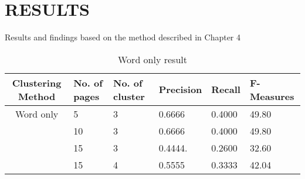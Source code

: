 \chapter{RESULTS}
Results and findings based on the method described in Chapter 4
\begin{table}[ht!]
\caption {Word only result}
\label{tab:Word only result}
\begin{center}
\begin{tabular}{|c|p{2cm}|p{1.5cm}|p{1.5cm}|p{2.1cm}|p{1.5cm}|} \hline

Clustering Method & No. of pages  & No. of cluster & Precision & Recall & F-Measures \\ \hline 

Word  only & 5 & 	3 & 0.6666  &	0.4000 & 49.80  \\ \hline 
&10 & 3& 0.6666 & 0.4000 & 49.80  \\ \hline 
 & 15 & 3 & 0.4444. & 0.2600 & 32.60  \\ \hline 
&15	&4		&0.5555	&0.3333	&42.04 \\ \hline 

\end{tabular}
\end{center}
\end{table}